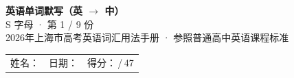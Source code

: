 \documentclass[10pt,a4paper]{article}
\begin{document}
\pagestyle{plain}

\begin{center}
{\LARGE\bfseries 英语单词默写（英 $\to$ 中）}\\[0.22em]
{\large S 字母 · 第 1 / 9 份}\\[0.18em]
{\small 2026年上海市高考英语词汇用法手册 · 参照普通高中英语课程标准}
\end{center}

\vspace{0.25em}
\noindent\begin{tabular}{@{}p{}@{}p{}@{}p{}@{}}
姓名：\underline{\hspace{2.0cm}} & 日期：\underline{\hspace{2.0cm}} & 得分：\underline{\hspace{1.3cm}}\,/\,47 \\
\end{tabular}

\vspace{0.3em}

\vspace{0.08em}
\end{document}
